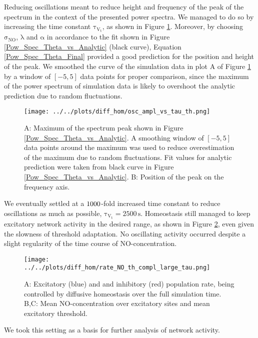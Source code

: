 \documentclass[10pt,a4paper]{article}
\begin{document}
Reducing oscillations meant to reduce height and frequency of the peak of the spectrum in the context of the presented power spectra. We managed to do so by increasing the time constant $\mathrm{\tau_{V_t}}$, as shown in Figure \ref{Peak_Prop_vs_Theta}. Moreover, by choosing $\mathrm{\sigma_{NO}}$, $\mathrm{\lambda}$ and $\mathrm{\alpha}$ in accordance to the fit shown in Figure \ref{Pow_Spec_Theta_vs_Analytic} (black curve), Equation \eqref{Pow_Spec_Theta_Final} provided a good prediction for the position and height of the peak. We smoothed the curve of the simulation data in plot A of Figure \ref{Peak_Prop_vs_Theta} by a window of $\mathrm{[-5,5]}$ data points for proper comparison, since the maximum of the power spectrum of simulation data is likely to overshoot the analytic prediction due to random fluctuations.  
\begin{figure}
\texttt{[image: ../../plots/diff\_hom/osc\_ampl\_vs\_tau\_th.png]}
\caption[Maximal height and corresponding frequency of the threshold power spectrum]{A: Maximum of the spectrum peak shown in Figure \ref{Pow_Spec_Theta_vs_Analytic}. A smoothing window of $\mathrm{[-5,5]}$ data points around the maximum was used to reduce overestimation of the maximum due to random fluctuations. Fit values for analytic prediction were taken from black curve in Figure \ref{Pow_Spec_Theta_vs_Analytic}. B: Position of the peak on the frequency axis.}
\label{Peak_Prop_vs_Theta}
\end{figure} 
We eventually settled at a $\rm 1000$-fold increased time constant to reduce oscillations as much as possible,  $\mathrm{\tau_{V_t}=2500\,s}$. Homeostasis still managed to keep excitatory network activity in the desired range, as shown in Figure \ref{full_sim_osci_slow_tau_th}, even given the slowness of threshold adaptation. No oscillating activity occurred despite a slight regularity of the time course of NO-concentration.  
\begin{figure}
\texttt{[image: ../../plots/diff\_hom/rate\_NO\_th\_compl\_large\_tau.png]}
\caption[Excitatory and inhibitory population rate controlled by diffusive homeostasis]{A: Excitatory (blue) and and inhibitory (red) population rate, being controlled by diffusive homeostasis over the full simulation time. B,C: Mean NO-concentration over excitatory sites and mean excitatory threshold.}
\label{full_sim_osci_slow_tau_th}
\end{figure}
We took this setting as a basis for further analysis of network activity.
\end{document}
